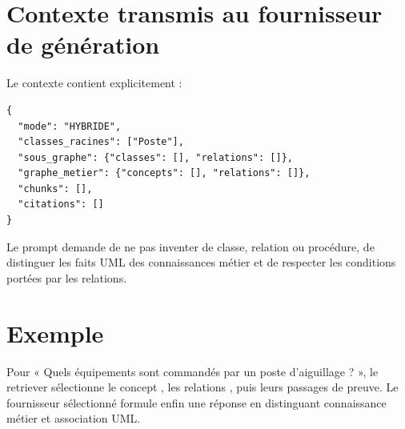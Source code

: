 \section{Contexte transmis au fournisseur de génération}

Le contexte contient explicitement :

\begin{lstlisting}[language={},caption={Structure simplifiée du contexte GraphRAG}]
{
  "mode": "HYBRIDE",
  "classes_racines": ["Poste"],
  "sous_graphe": {"classes": [], "relations": []},
  "graphe_metier": {"concepts": [], "relations": []},
  "chunks": [],
  "citations": []
}
\end{lstlisting}

Le prompt demande de ne pas inventer de classe, relation ou procédure, de distinguer les faits UML des connaissances métier et de respecter les conditions portées par les relations.

\section{Exemple}

Pour « Quels équipements sont commandés par un poste d'aiguillage ? », le retriever sélectionne le concept , les relations , puis leurs passages de preuve. Le fournisseur sélectionné formule enfin une réponse en distinguant connaissance métier et association UML.

